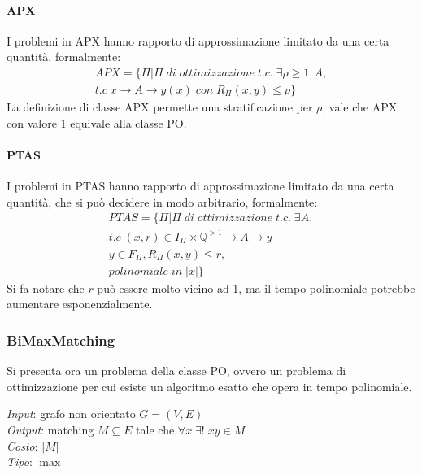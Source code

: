 \paragraph{APX}
I problemi in APX hanno rapporto di approssimazione limitato da una certa quantità, 
formalmente: 
\begin{equation}
    \begin{aligned}
        \mathit{APX} = \{\Pi | \Pi \mathit{\;di\;ottimizzazione\;t.c.\;}
\exists \rho \geq 1, A, \\\mathit{t.c\;} x\rightarrow A \rightarrow y(x)\;\mathit{con}\;R_\Pi(x, y) \leq \rho\}
    \end{aligned}
\end{equation}
La definizione di classe APX permette una stratificazione per $\rho$, vale che APX 
con valore 1 equivale alla classe PO.

\paragraph{PTAS}
I problemi in PTAS hanno rapporto di approssimazione limitato da una certa quantità,
che si può decidere in modo arbitrario, formalmente: 
\begin{equation}
    \begin{aligned}
        \mathit{PTAS} = \{\Pi | \Pi \mathit{\;di\;ottimizzazione\;t.c.\;}\exists A, \\
\mathit{t.c\;} (x, r) \in I_\Pi \times \mathbb{Q}^{>1} \rightarrow A \rightarrow y \\
y \in F_\Pi, R_\Pi(x, y) \leq r, \\\mathit{polinomiale\;in\;} |x|\}
    \end{aligned}
\end{equation}
Si fa notare che $r$ può essere molto vicino ad 1, ma il tempo polinomiale
potrebbe aumentare esponenzialmente.

\subsubsection{BiMaxMatching}
Si presenta ora un problema della classe PO, ovvero un problema di ottimizzazione
per cui esiste un algoritmo esatto che opera in tempo polinomiale.

\emph{Input}: grafo non orientato $G = (V,E)$\\
\emph{Output}: matching $M \subseteq E$ tale che $\forall x\;\exists!\;xy \in M$\\
\emph{Costo}: $|M|$\\
\emph{Tipo}: $\max$

